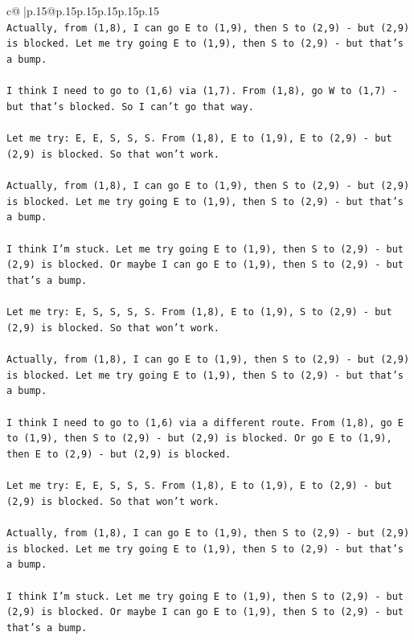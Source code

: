 \documentclass{article}
\begin{document}
{\begin{supertabular}{c@{$\;$}|p{.15\linewidth}@{}p{.15\linewidth}p{.15\linewidth}p{.15\linewidth}p{.15\linewidth}p{.15\linewidth}}
{{{\\ 
\texttt{Actually, from (1,8), I can go E to (1,9), then S to (2,9) {-} but (2,9) is blocked. Let me try going E to (1,9), then S to (2,9) {-} but that's a bump.} \\
\\ 
\texttt{I think I need to go to (1,6) via (1,7). From (1,8), go W to (1,7) {-} but that's blocked. So I can't go that way.} \\
\\ 
\texttt{Let me try: E, E, S, S, S. From (1,8), E to (1,9), E to (2,9) {-} but (2,9) is blocked. So that won't work.} \\
\\ 
\texttt{Actually, from (1,8), I can go E to (1,9), then S to (2,9) {-} but (2,9) is blocked. Let me try going E to (1,9), then S to (2,9) {-} but that's a bump.} \\
\\ 
\texttt{I think I'm stuck. Let me try going E to (1,9), then S to (2,9) {-} but (2,9) is blocked. Or maybe I can go E to (1,9), then S to (2,9) {-} but that's a bump.} \\
\\ 
\texttt{Let me try: E, S, S, S, S. From (1,8), E to (1,9), S to (2,9) {-} but (2,9) is blocked. So that won't work.} \\
\\ 
\texttt{Actually, from (1,8), I can go E to (1,9), then S to (2,9) {-} but (2,9) is blocked. Let me try going E to (1,9), then S to (2,9) {-} but that's a bump.} \\
\\ 
\texttt{I think I need to go to (1,6) via a different route. From (1,8), go E to (1,9), then S to (2,9) {-} but (2,9) is blocked. Or go E to (1,9), then E to (2,9) {-} but (2,9) is blocked.} \\
\\ 
\texttt{Let me try: E, E, S, S, S. From (1,8), E to (1,9), E to (2,9) {-} but (2,9) is blocked. So that won't work.} \\
\\ 
\texttt{Actually, from (1,8), I can go E to (1,9), then S to (2,9) {-} but (2,9) is blocked. Let me try going E to (1,9), then S to (2,9) {-} but that's a bump.} \\
\\ 
\texttt{I think I'm stuck. Let me try going E to (1,9), then S to (2,9) {-} but (2,9) is blocked. Or maybe I can go E to (1,9), then S to (2,9) {-} but that's a bump.} \\
}}}
\end{supertabular}}
\end{document}
